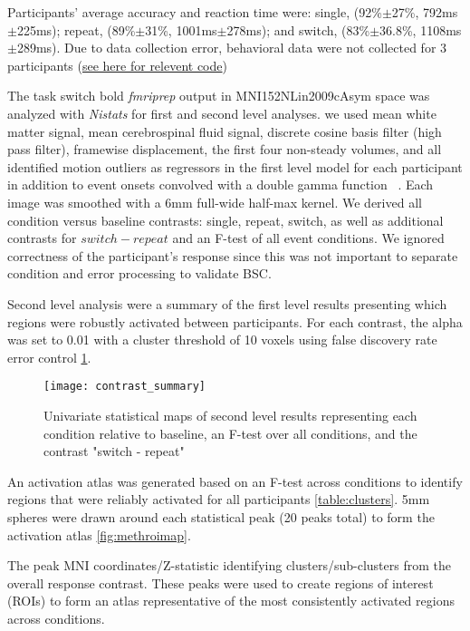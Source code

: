 \documentclass[10pt,letterpaper]{article}
\begin{document}
Participants' average accuracy and reaction time were:
single, (92\%$\pm$27\%, 792ms$\pm$225ms); repeat, (89\%$\pm$31\%, 1001ms$\pm$278ms);
and switch, (83\%$\pm$36.8\%, 1108ms$\pm$289ms).
Due to data collection error, behavioral data were not collected for 3 participants
(\href{https://github.com/jdkent/BetaSeriesRealDataAnalysis/blob/90fafb5b83b2e1bfade61a9fb1a87f225efaa95f/summarizeBehavior/summarize_behavior.ipynb}{see here for relevent code})

The task switch bold \emph{fmriprep} output in MNI152NLin2009cAsym space
was analyzed with \emph{Nistats} for first and second level analyses.
we used mean white matter signal, mean cerebrospinal fluid signal,
discrete cosine basis filter (high pass filter), framewise displacement, the first four non-steady volumes, and
all identified motion outliers as regressors in the first level model for each participant
in addition to event onsets convolved with a double gamma function ~\cite{Glover1999}.
Each image was smoothed with a 6mm full-wide half-max kernel.
We derived all condition versus baseline contrasts: single, repeat, switch, as well as
additional contrasts for $switch - repeat$ and an F-test of all event conditions.
We ignored correctness of the participant's response since this was not important to
separate condition and error processing to validate BSC.

Second level analysis were a summary of the first level results presenting which
regions were robustly activated between participants.
For each contrast, the alpha was set to 0.01 with a cluster threshold of 10 voxels using
false discovery rate error control \ref{fig:stat_maps}.

\begin{figure}[H]
  \centering
  \texttt{[image: contrast\_summary]}
  \caption{
    Univariate statistical maps of second level results representing
    each condition relative to baseline, an F-test over all conditions,
    and the contrast "switch - repeat"}
  \label{fig:stat_maps}
\end{figure}

An activation atlas was generated based on an F-test across conditions
to identify regions that were reliably activated for all participants \ref{table:clusters}.
5mm spheres were drawn around each statistical peak (20 peaks total)
to form the activation atlas \ref{fig:methroimap}.

\begin{table}[H]
  \caption{
    The peak MNI coordinates/Z-statistic identifying clusters/sub-clusters from the overall
    response contrast.
    These peaks were used to create regions of interest (ROIs) to form an atlas representative
    of the most consistently activated regions across conditions.
  }
  \label{table:clusters}
\end{table}
\end{document}
